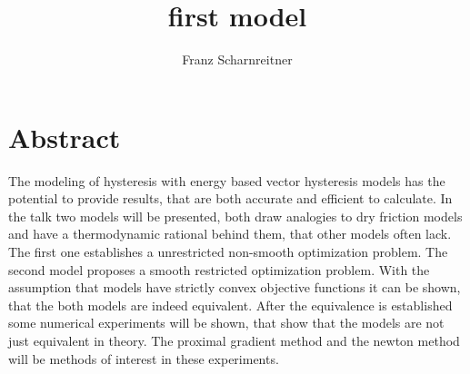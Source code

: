 \documentclass[a4paper,10pt]{article}
\title{first model}
\author{Franz Scharnreitner}
\begin{document}
\maketitle
\section{Abstract}
The modeling of hysteresis with energy based vector hysteresis models has the potential to provide results, that are both accurate and efficient to calculate. In the talk two models will be presented, both draw analogies to dry friction models and have a thermodynamic rational behind them, that other models often lack. The first one establishes a unrestricted non-smooth optimization problem. The second model proposes a smooth restricted optimization problem. With the assumption that models have strictly convex objective functions it can be shown, that the both models are indeed equivalent. After the equivalence is established some numerical experiments will be shown, that show that the models are not just equivalent in theory. The proximal gradient method and the newton method will be methods of interest in these experiments. 
\end{document}
